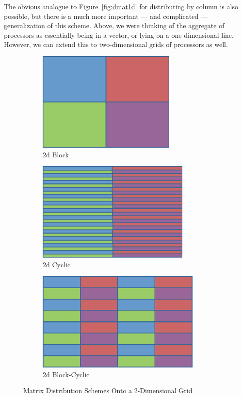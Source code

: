 The obvious analogue to Figure~\ref{fig:dmat1d} for distributing by column is also possible, but there is a much more important --- and complicated --- generalization of this scheme.  Above, we were thinking of the aggregate of processors as essentially being in a vector, or lying on a one-dimensional line.  However, we can extend this to two-dimensional grids of processors as well.  
\begin{figure}[ht]
        \centering
        \begin{subfigure}[b]{0.3\textwidth}
                \centering
                \includegraphics[height=5cm,width=\textwidth]{pbdDEMO-include/pics/dmat_block2d}
                \caption{2d Block}
        \end{subfigure}%
        \hspace{.1cm}
        \begin{subfigure}[b]{0.3\textwidth}
                \centering
                \includegraphics[height=5cm,width=\textwidth]{pbdDEMO-include/pics/dmat_cyclic2d}
                \caption{2d Cyclic}
        \end{subfigure}
        \hspace{.01cm}
        \begin{subfigure}[b]{0.3\textwidth}
                \centering
                \includegraphics[height=5cm,width=\textwidth]{pbdDEMO-include/pics/dmat_blockcyclic2d}
                \caption{2d Block-Cyclic}
        \end{subfigure}
        \caption{Matrix Distribution Schemes Onto a 2-Dimensional Grid}\label{fig:dmat2d}
\end{figure}
